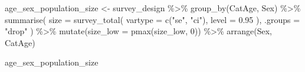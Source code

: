 \documentclass[
  spanish,
  11pt,
  letterpaper,
  oneside,
  open=any]{scrbook}
\newenvironment{Shaded}{\begin{snugshade}}{\end{snugshade}}
\newcommand{\AttributeTok}[1]{\textcolor[rgb]{0.40,0.45,0.13}{#1}}
\newcommand{\DecValTok}[1]{\textcolor[rgb]{0.68,0.00,0.00}{#1}}
\newcommand{\FloatTok}[1]{\textcolor[rgb]{0.68,0.00,0.00}{#1}}
\newcommand{\FunctionTok}[1]{\textcolor[rgb]{0.28,0.35,0.67}{#1}}
\newcommand{\NormalTok}[1]{\textcolor[rgb]{0.00,0.23,0.31}{#1}}
\newcommand{\OtherTok}[1]{\textcolor[rgb]{0.00,0.23,0.31}{#1}}
\newcommand{\SpecialCharTok}[1]{\textcolor[rgb]{0.37,0.37,0.37}{#1}}
\newcommand{\StringTok}[1]{\textcolor[rgb]{0.13,0.47,0.30}{#1}}
\begin{document}
\begin{Shaded}
\begin{Highlighting}[]
\NormalTok{age\_sex\_population\_size }\OtherTok{\textless{}{-}}\NormalTok{ survey\_design }\SpecialCharTok{\%\textgreater{}\%}
  \FunctionTok{group\_by}\NormalTok{(CatAge, Sex) }\SpecialCharTok{\%\textgreater{}\%}
  \FunctionTok{summarise}\NormalTok{(}
    \AttributeTok{size =} \FunctionTok{survey\_total}\NormalTok{(}
      \AttributeTok{vartype =} \FunctionTok{c}\NormalTok{(}\StringTok{"se"}\NormalTok{, }\StringTok{"ci"}\NormalTok{),}
      \AttributeTok{level =} \FloatTok{0.95}
\NormalTok{    ),}
    \AttributeTok{.groups =} \StringTok{"drop"}
\NormalTok{  ) }\SpecialCharTok{\%\textgreater{}\%}
  \FunctionTok{mutate}\NormalTok{(}\AttributeTok{size\_low =} \FunctionTok{pmax}\NormalTok{(size\_low, }\DecValTok{0}\NormalTok{)) }\SpecialCharTok{\%\textgreater{}\%}
  \FunctionTok{arrange}\NormalTok{(Sex, CatAge)}

\NormalTok{age\_sex\_population\_size}
\end{Highlighting}
\end{Shaded}
\end{document}
